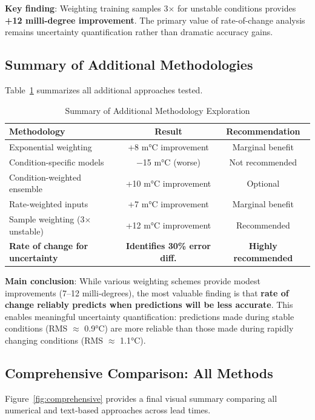 \documentclass[11pt,letterpaper]{article}
\begin{document}
\textbf{Key finding}: Weighting training samples 3$\times$ for unstable conditions provides \textbf{+12 milli-degree improvement}. The primary value of rate-of-change analysis remains uncertainty quantification rather than dramatic accuracy gains.

\subsection{Summary of Additional Methodologies}

Table~\ref{tab:methodology_summary} summarizes all additional approaches tested.

\begin{table}[H]
\centering
\caption{Summary of Additional Methodology Exploration}
\label{tab:methodology_summary}
\begin{tabular}{lcc}
\toprule
\textbf{Methodology} & \textbf{Result} & \textbf{Recommendation} \\
\midrule
Exponential weighting & +8 m°C improvement & Marginal benefit \\
Condition-specific models & $-$15 m°C (worse) & Not recommended \\
Condition-weighted ensemble & +10 m°C improvement & Optional \\
Rate-weighted inputs & +7 m°C improvement & Marginal benefit \\
Sample weighting (3$\times$ unstable) & +12 m°C improvement & Recommended \\
\midrule
\textbf{Rate of change for uncertainty} & \textbf{Identifies 30\% error diff.} & \textbf{Highly recommended} \\
\bottomrule
\end{tabular}
\end{table}

\textbf{Main conclusion}: While various weighting schemes provide modest improvements (7--12 milli-degrees), the most valuable finding is that \textbf{rate of change reliably predicts when predictions will be less accurate}. This enables meaningful uncertainty quantification: predictions made during stable conditions (RMS $\approx$ 0.9°C) are more reliable than those made during rapidly changing conditions (RMS $\approx$ 1.1°C).

\subsection{Comprehensive Comparison: All Methods}

Figure~\ref{fig:comprehensive} provides a final visual summary comparing all numerical and text-based approaches across lead times.
\end{document}
